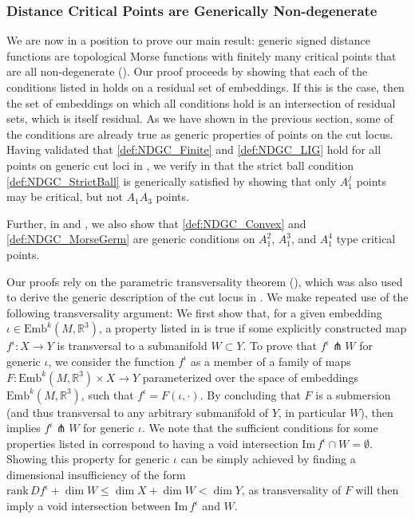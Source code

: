 \documentclass[11pt]{article}
\newcommand{\R}{\mathbb{R}}
\newcommand{\io}{\iota}
\newcommand{\inter}{\cap}
\newcommand{\Emb}{\mathrm{Emb}^k(M,\R^3)}
\renewcommand{\Im}{\mathrm{Im} \,}
\newcommand{\rank}{\mathrm{rank} \,}
\theoremstyle{plain}
\theoremstyle{definition}
\theoremstyle{remark}
\begin{document}
	
	\subsubsection{Distance Critical Points are Generically Non-degenerate}
	
	We are now in a position to prove our main result: generic signed distance functions are topological Morse functions with finitely many critical points that are all non-degenerate (). Our proof proceeds by showing that each of the conditions listed in  holds on a residual set of embeddings. If this is the case, then the set of embeddings on which all conditions hold is an intersection of residual sets, which is itself residual. As we have shown in the previous section, some of the conditions are already true as generic properties of points on the cut locus. Having validated that \ref{def:NDGC_Finite} and \ref{def:NDGC_LIG} hold for all points on generic cut loci in , we verify in  that the strict ball condition \ref{def:NDGC_StrictBall} is generically satisfied by showing that only $A_1^j$ points may be critical, but not $A_1A_3$ points. 
	
	Further, in  and , we also show that \ref{def:NDGC_Convex} and \ref{def:NDGC_MorseGerm} are generic conditions on $A_1^2$, $A_1^3$, and $A_1^4$ type critical points.  
	
	Our proofs rely on the parametric transversality theorem (), which was also used to derive the generic description of the cut locus in .
	We make repeated use of the following transversality argument:
	We first show that, for a given embedding $\io \in \Emb$, a property listed in  is true if some explicitly constructed map $f^\io : X \to Y$ is transversal to a submanifold $W \subset Y$. 
	To prove that $f^\io \pitchfork W$ for generic $\io$, we consider the function $f^\io$ as a member of a family of maps $F : \Emb \times X \to Y$ parameterized over the space of embeddings $\Emb$, such that $f^\io = F(\io, \cdot)$. By concluding that $F$ is a submersion (and thus transversal to any arbitrary submanifold of $Y$, in particular $W$),  then implies $f^\io \pitchfork W$ for generic $\io$.
	We note that the sufficient conditions for some properties listed in  correspond to having a void intersection $\Im f^\io \inter W = \emptyset$. Showing this property for generic $\io$ can be simply achieved by finding a dimensional insufficiency of the form $\rank Df^\io + \dim W \leq \dim X + \dim W < \dim Y$, as transversality of $F$ will then imply a void intersection between $\Im f^\io$ and $W$.
	
\end{document}

